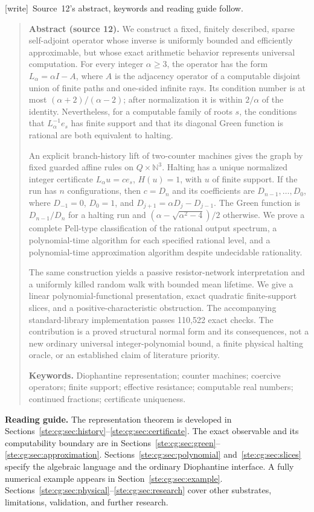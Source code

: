 \documentclass[11pt,letterpaper]{article}
\theoremstyle{definition}
\theoremstyle{remark}
\newcommand{\N}{\mathbb N}
\newcommand{\wtag}{\textup{[write]}}
\begin{document}
\noindent\wtag\ Source~12's abstract, keywords and reading guide follow.

\begin{quote}\small
\textbf{Abstract (source 12).} We construct a fixed, finitely described, sparse self-adjoint operator whose
inverse is uniformly bounded and efficiently approximable, but whose exact
arithmetic behavior represents universal computation. For every integer
$\alpha\ge3$, the operator has the form $L_\alpha=\alpha I-A$, where $A$ is
the adjacency operator of a computable disjoint union of finite paths and
one-sided infinite rays. Its condition number is at most
$(\alpha+2)/(\alpha-2)$; after normalization it is within $2/\alpha$ of the
identity. Nevertheless, for a computable family of roots $s$, the conditions
that $L_\alpha^{-1}e_s$ has finite support and that its diagonal Green
function is rational are both equivalent to halting.

An explicit branch-history lift of two-counter machines gives the graph by
fixed guarded affine rules on $Q\times\N^3$. Halting has a unique normalized
integer certificate $L_\alpha u=c e_s$, $H(u)=1$, with $u$ of finite support.
If the run has $n$ configurations, then $c=D_n$ and its coefficients are
$D_{n-1},\ldots,D_0$, where $D_{-1}=0$, $D_0=1$, and
$D_{j+1}=\alpha D_j-D_{j-1}$. The Green function is $D_{n-1}/D_n$ for a
halting run and $(\alpha-\sqrt{\alpha^2-4})/2$ otherwise. We prove a complete
Pell-type classification of the rational output spectrum, a polynomial-time
algorithm for each specified rational level, and a polynomial-time
approximation algorithm despite undecidable rationality.

The same construction yields a passive resistor-network interpretation and
a uniformly killed random walk with bounded mean lifetime. We give a linear
polynomial-functional presentation, exact quadratic finite-support slices,
and a positive-characteristic obstruction. The accompanying standard-library
implementation passes 110,522 exact checks. The contribution is a proved
structural normal form and its consequences, not a new ordinary universal
integer-polynomial bound, a finite physical halting oracle, or an established
claim of literature priority.

\textbf{Keywords.} Diophantine representation; counter machines;
coercive operators; finite support; effective resistance; computable real
numbers; continued fractions; certificate uniqueness.
\end{quote}
\noindent\textbf{Reading guide.}
The representation theorem is developed in Sections~\ref{ste:cg:sec:history}--\ref{ste:cg:sec:certificate}.
The exact observable and its computability boundary are in
Sections~\ref{ste:cg:sec:green}--\ref{ste:cg:sec:approximation}. Sections~\ref{ste:cg:sec:polynomial}
and~\ref{ste:cg:sec:slices} specify the algebraic language and the ordinary
Diophantine interface. A fully numerical example appears in
Section~\ref{ste:cg:sec:example}. Sections~\ref{ste:cg:sec:physical}--\ref{ste:cg:sec:research}
cover other substrates, limitations, validation, and further research.
\end{document}
